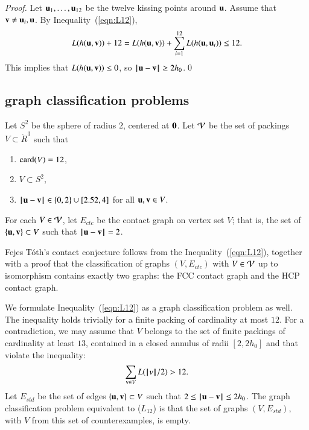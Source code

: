 \documentclass{llncs}
\begin{document}
\begin{proof}
Let $ {\mathbf u}_1,\ldots, {\mathbf u}_{12}$ be the twelve kissing points
  around ${\mathbf u}$.  Assume that ${\mathbf v}\ne {\mathbf u}_i,{\mathbf u}$.  By
  Inequality~(\ref{eqn:L12}),
\[
   L(h( {\mathbf u}, {\mathbf v}))  + 12 
  =  L(h( {\mathbf u}, {\mathbf v})) + \sum_{i=1}^{12} L(h( {\mathbf u}, {\mathbf u}_i))  \le 12.
\]
This implies that $L(h( {\mathbf u}, {\mathbf v}))\le 0$, so $\norm{ \u}{ \v}\ge 2h_0$.\qed
\end{proof}


\subsection{graph classification problems}

\begin{definition}
  Let $S^2$ be the sphere of radius $2$, centered at ${\mathbf 0}$.  Let
  ${\mathcal V}$ be the set of packings $V\subset \ring{R}^3$ such that
\begin{enumerate}
\item ${\operatorname{card}}(V) = 12$,
\item $V\subset S^2$,
\item $\norm{\u}{\v} \in \{0,2\}\cup
  \leftclosed2.52,4\rightclosed$ for all ${\mathbf u},{\mathbf v}\in V$.
\end{enumerate}
For each $V\in {\mathcal V}$, let $E_{ctc}$ be the contact graph on vertex set $V$;
that is, the set of $\{{\mathbf u},{\mathbf v}\}\subset V$ such that $\norm{\u}{\v}=2$.
\end{definition}

Fejes T\'oth's contact conjecture follows from the
Inequality~(\ref{eqn:L12}), together with a proof that the
classification of graphs $(V,E_{ctc})$ with $V\in {\mathcal V}$ up to
isomorphism contains exactly two graphs: the FCC contact graph and the
HCP contact graph.

We formulate Inequality~(\ref{eqn:L12}) as a graph classification
problem as well.  The inequality holds trivially for a finite packing
of cardinality at most $12$.  For a contradiction, we may assume that
$V$ belongs to the set of finite packings of cardinality at least $13$,
contained in a closed annulus of radii $[2,2h_0]$ and that violate the
inequality:
\[
\sum_{{\mathbf v}\in V} L({{\hskip0.1em|\hskip-0.15em|\hskip0.1em}v{\hskip0.1em|\hskip-0.15em|\hskip0.1em}}/2) > 12.
\]
Let $E_{std}$ be the set of edges $\{{\mathbf u},{\mathbf v}\}\subset V$ such that
$2\le\norm{\u}{\v}\le 2h_0$.  The graph classification problem
equivalent to ($L_{12}$) is that the set of graphs $(V,E_{std})$, with
$V$ from this set of counterexamples, is empty.
\end{document}
